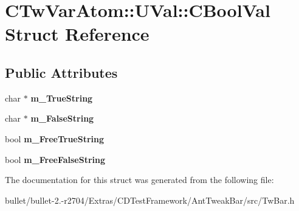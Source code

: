 \hypertarget{struct_c_tw_var_atom_1_1_u_val_1_1_c_bool_val}{\section{C\+Tw\+Var\+Atom\+:\+:U\+Val\+:\+:C\+Bool\+Val Struct Reference}
\label{struct_c_tw_var_atom_1_1_u_val_1_1_c_bool_val}
}
\subsection*{Public Attributes}
\begin{DoxyCompactItemize}
\item 
\hypertarget{struct_c_tw_var_atom_1_1_u_val_1_1_c_bool_val_a164ff16521c4968c2b62c7433709a195}{char $\ast$ {\bfseries m\+\_\+\+True\+String}}\label{struct_c_tw_var_atom_1_1_u_val_1_1_c_bool_val_a164ff16521c4968c2b62c7433709a195}

\item 
\hypertarget{struct_c_tw_var_atom_1_1_u_val_1_1_c_bool_val_acf24a967220510cb83f61a7fcda821f2}{char $\ast$ {\bfseries m\+\_\+\+False\+String}}\label{struct_c_tw_var_atom_1_1_u_val_1_1_c_bool_val_acf24a967220510cb83f61a7fcda821f2}

\item 
\hypertarget{struct_c_tw_var_atom_1_1_u_val_1_1_c_bool_val_a82332fcb8013dee088d13ed4167db7d1}{bool {\bfseries m\+\_\+\+Free\+True\+String}}\label{struct_c_tw_var_atom_1_1_u_val_1_1_c_bool_val_a82332fcb8013dee088d13ed4167db7d1}

\item 
\hypertarget{struct_c_tw_var_atom_1_1_u_val_1_1_c_bool_val_a1b1d6213fbda4b0ffb82842485d3e432}{bool {\bfseries m\+\_\+\+Free\+False\+String}}\label{struct_c_tw_var_atom_1_1_u_val_1_1_c_bool_val_a1b1d6213fbda4b0ffb82842485d3e432}

\end{DoxyCompactItemize}


The documentation for this struct was generated from the following file\+:\begin{DoxyCompactItemize}
\item 
bullet/bullet-\/2.-\/r2704/\+Extras/\+C\+D\+Test\+Framework/\+Ant\+Tweak\+Bar/src/Tw\+Bar.\+h\end{DoxyCompactItemize}
